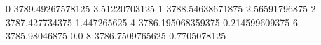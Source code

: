 0 3789.49267578125 3.51220703125
1 3788.54638671875 2.56591796875
2 3787.427734375 1.447265625
4 3786.195068359375 0.214599609375
6 3785.98046875 0.0
8 3786.7509765625 0.7705078125
